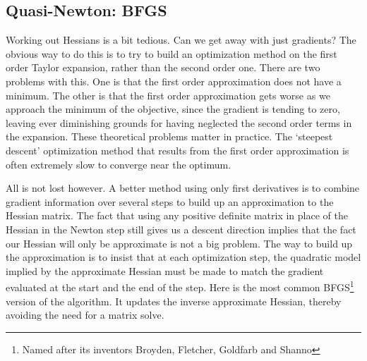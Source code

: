 \documentclass[10pt] {article}
\theoremstyle{definition}
\begin{document}
\subsection{Quasi-Newton: BFGS}

Working out Hessians is a bit tedious. Can we get away with just gradients? The obvious way to do this is to try to build an optimization method on the first order Taylor expansion, rather than the second order one. There are two problems with this. One is that the first order approximation does not have a minimum. The other is that the first order approximation gets worse as we approach the minimum of the objective, since the gradient is tending to zero, leaving ever diminishing grounds for having neglected the second order terms in the expansion. These theoretical problems matter in practice. The `steepest descent' optimization method that results from the first order approximation is often extremely slow to converge near the optimum. 

All is not lost however. A better method using only first derivatives is to combine gradient information over several steps to build up an approximation to the Hessian matrix. The fact that using any positive definite matrix in place of the Hessian in the Newton step still gives us a descent direction implies that the fact our Hessian will only be approximate is not a big problem. The way to build up the approximation is to insist that at each optimization step, the quadratic model implied by the approximate Hessian must be made to match the gradient evaluated at the start and the end of the step. Here is the most common BFGS\footnote{Named after its inventors Broyden, Fletcher, Goldfarb and Shanno} version of the algorithm. It updates the inverse approximate Hessian, thereby avoiding the need for a matrix solve.
\end{document}
